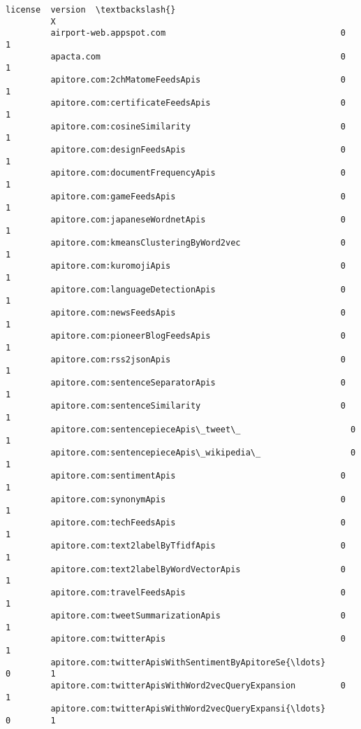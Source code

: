 \documentclass[11pt]{article}
\begin{document}
\begin{Verbatim}[commandchars=\\\{\}]
                                                             license  version  \textbackslash{}
         X                                                                      
         airport-web.appspot.com                                   0        1   
         apacta.com                                                0        1   
         apitore.com:2chMatomeFeedsApis                            0        1   
         apitore.com:certificateFeedsApis                          0        1   
         apitore.com:cosineSimilarity                              0        1   
         apitore.com:designFeedsApis                               0        1   
         apitore.com:documentFrequencyApis                         0        1   
         apitore.com:gameFeedsApis                                 0        1   
         apitore.com:japaneseWordnetApis                           0        1   
         apitore.com:kmeansClusteringByWord2vec                    0        1   
         apitore.com:kuromojiApis                                  0        1   
         apitore.com:languageDetectionApis                         0        1   
         apitore.com:newsFeedsApis                                 0        1   
         apitore.com:pioneerBlogFeedsApis                          0        1   
         apitore.com:rss2jsonApis                                  0        1   
         apitore.com:sentenceSeparatorApis                         0        1   
         apitore.com:sentenceSimilarity                            0        1   
         apitore.com:sentencepieceApis\_tweet\_                      0        1   
         apitore.com:sentencepieceApis\_wikipedia\_                  0        1   
         apitore.com:sentimentApis                                 0        1   
         apitore.com:synonymApis                                   0        1   
         apitore.com:techFeedsApis                                 0        1   
         apitore.com:text2labelByTfidfApis                         0        1   
         apitore.com:text2labelByWordVectorApis                    0        1   
         apitore.com:travelFeedsApis                               0        1   
         apitore.com:tweetSummarizationApis                        0        1   
         apitore.com:twitterApis                                   0        1   
         apitore.com:twitterApisWithSentimentByApitoreSe{\ldots}        0        1   
         apitore.com:twitterApisWithWord2vecQueryExpansion         0        1   
         apitore.com:twitterApisWithWord2vecQueryExpansi{\ldots}        0        1   

\end{Verbatim}
\end{document}
